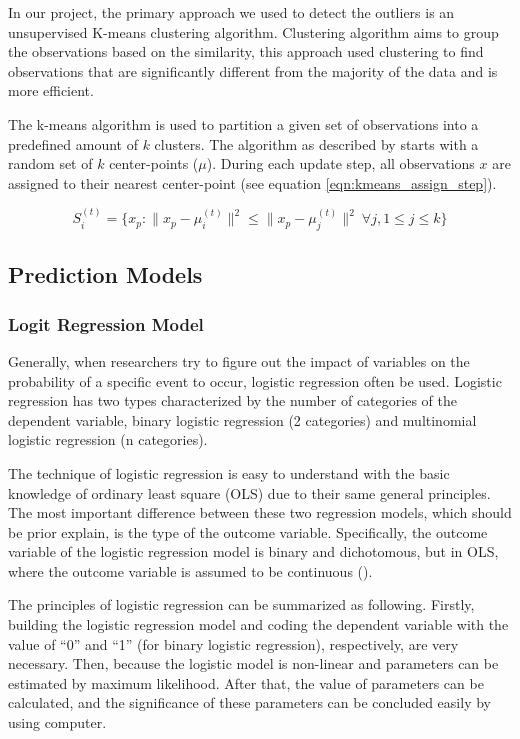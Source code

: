 \documentclass[a4paper,11pt]{article}
\begin{document}
In our project, the primary approach we used to detect the outliers is an unsupervised K-means clustering algorithm.\cite{loureiro2004outlier} Clustering algorithm aims to group the observations based on the similarity, this approach used clustering to find observations that are significantly different from the majority of the data and is more efficient. 

The k-means algorithm is used to partition a given set of observations into a predefined amount of $k$ clusters. The algorithm as described by \cite{macqueen1967some} starts with a random set of $k$ center-points ($\mu$). During each update step, all observations $x$ are assigned to their nearest center-point (see equation \ref{eqn:kmeans_assign_step}). 

\begin{equation}
S_i^{(t)} = \big \{ x_p : \big \| x_p - \mu^{(t)}_i \big \|^2 \le \big \| x_p - \mu^{(t)}_j \big \|^2 \ \forall j, 1 \le j \le k \big\}
\label{eqn:kmeans_assign_step}
\end{equation}

\subsection{Prediction Models}
\subsubsection{Logit Regression Model}
Generally, when researchers try to figure out the impact of variables on the probability of a specific event to occur, logistic regression often be used. Logistic regression has two types characterized by the number of categories of the dependent variable, binary logistic regression (2 categories) and multinomial logistic regression (n categories).

The technique of logistic regression is easy to understand with the basic knowledge of ordinary least square (OLS) due to their same general principles. The most important difference between these two regression models, which should be prior explain, is the type of the outcome variable. Specifically, the outcome variable of the logistic regression model is binary and dichotomous, but in OLS, where the outcome variable is assumed to be continuous (\cite{appliedlogit}).

The principles of logistic regression can be summarized as following. Firstly, building the logistic regression model and coding the dependent variable with the value of “0” and “1” (for binary logistic regression), respectively, are very necessary. Then, because the logistic model is non-linear and parameters can be estimated by maximum likelihood. After that, the value of parameters can be calculated, and the significance of these parameters can be concluded easily by using computer. 
\end{document}
